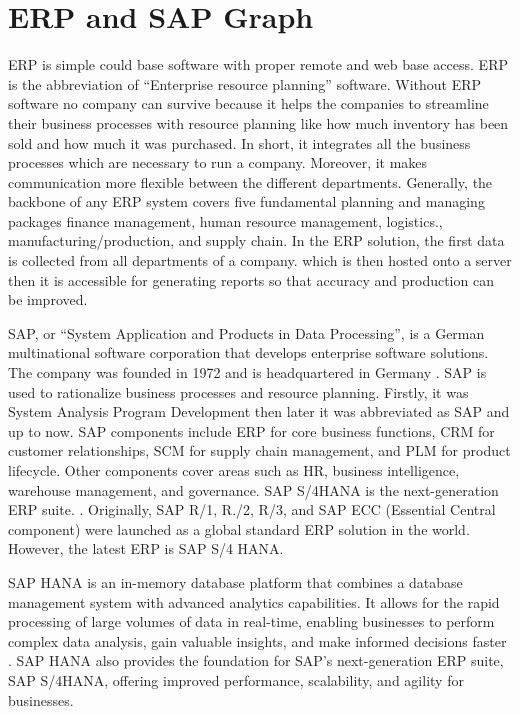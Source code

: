 \documentclass{article}
\begin{document}
\maketitle
\section{ERP and SAP Graph}
ERP is simple could base software with proper remote and web base access. ERP is the abbreviation of “Enterprise resource planning” software. Without ERP software no company can survive because it helps the companies to streamline their business processes with resource planning like how much inventory has been sold and how much it was purchased. In short, it integrates all the business processes which are necessary to run a company. Moreover, it makes communication more flexible between the different departments. Generally, the backbone of any ERP system covers five fundamental planning and managing packages finance management, human resource management, logistics., manufacturing/production, and supply chain. In the ERP solution, the first data is collected from all departments of a company. which is then hosted onto a server then it is accessible for generating reports so that accuracy and production can be improved. \parencite{anderson2023}

SAP, or “System Application and Products in Data Processing”, is a German multinational software corporation that develops enterprise software solutions. The company was founded in 1972 and is headquartered in Germany \parencite{lombardi2023}. SAP is used to rationalize business processes and resource planning. Firstly, it was System Analysis Program Development then later it was abbreviated as SAP and up to now. SAP components include ERP for core business functions, CRM for customer relationships, SCM for supply chain management, and PLM for product lifecycle. Other components cover areas such as HR, business intelligence, warehouse management, and governance. SAP S/4HANA is the next-generation ERP suite. \parencite{lombardi2023}. Originally, SAP R/1, R./2, R/3, and SAP ECC (Essential Central component) were launched as a global standard ERP solution in the world. However, the latest ERP is SAP S/4 HANA. 

SAP HANA is an in-memory database platform that combines a database management system with advanced analytics capabilities. It allows for the rapid processing of large volumes of data in real-time, enabling businesses to perform complex data analysis, gain valuable insights, and make informed decisions faster \parencite{lombardi2023}. SAP HANA also provides the foundation for SAP's next-generation ERP suite, SAP S/4HANA, offering improved performance, scalability, and agility for businesses.
\end{document}
